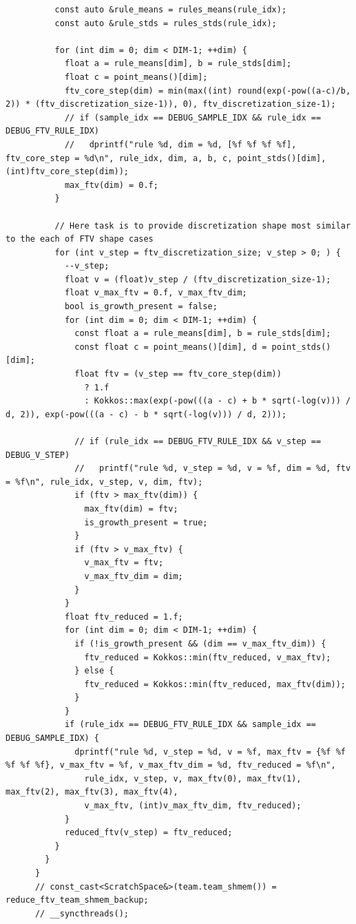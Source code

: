 \begin{verbatim}
          const auto &rule_means = rules_means(rule_idx);
          const auto &rule_stds = rules_stds(rule_idx);

          for (int dim = 0; dim < DIM-1; ++dim) {
            float a = rule_means[dim], b = rule_stds[dim];
            float c = point_means()[dim];
            ftv_core_step(dim) = min(max((int) round(exp(-pow((a-c)/b, 2)) * (ftv_discretization_size-1)), 0), ftv_discretization_size-1);
            // if (sample_idx == DEBUG_SAMPLE_IDX && rule_idx == DEBUG_FTV_RULE_IDX)
            //   dprintf("rule %d, dim = %d, [%f %f %f %f], ftv_core_step = %d\n", rule_idx, dim, a, b, c, point_stds()[dim], (int)ftv_core_step(dim));
            max_ftv(dim) = 0.f;
          }

          // Here task is to provide discretization shape most similar to the each of FTV shape cases
          for (int v_step = ftv_discretization_size; v_step > 0; ) {
            --v_step;
            float v = (float)v_step / (ftv_discretization_size-1);
            float v_max_ftv = 0.f, v_max_ftv_dim;
            bool is_growth_present = false;
            for (int dim = 0; dim < DIM-1; ++dim) {
              const float a = rule_means[dim], b = rule_stds[dim];
              const float c = point_means()[dim], d = point_stds()[dim];
              float ftv = (v_step == ftv_core_step(dim))
                ? 1.f
                : Kokkos::max(exp(-pow(((a - c) + b * sqrt(-log(v))) / d, 2)), exp(-pow(((a - c) - b * sqrt(-log(v))) / d, 2)));

              // if (rule_idx == DEBUG_FTV_RULE_IDX && v_step == DEBUG_V_STEP)
              //   printf("rule %d, v_step = %d, v = %f, dim = %d, ftv = %f\n", rule_idx, v_step, v, dim, ftv);
              if (ftv > max_ftv(dim)) {
                max_ftv(dim) = ftv;
                is_growth_present = true;
              }
              if (ftv > v_max_ftv) {
                v_max_ftv = ftv;
                v_max_ftv_dim = dim;
              }
            }
            float ftv_reduced = 1.f;
            for (int dim = 0; dim < DIM-1; ++dim) {
              if (!is_growth_present && (dim == v_max_ftv_dim)) {
                ftv_reduced = Kokkos::min(ftv_reduced, v_max_ftv);
              } else {
                ftv_reduced = Kokkos::min(ftv_reduced, max_ftv(dim));
              }
            }
            if (rule_idx == DEBUG_FTV_RULE_IDX && sample_idx == DEBUG_SAMPLE_IDX) {
              dprintf("rule %d, v_step = %d, v = %f, max_ftv = {%f %f %f %f %f}, v_max_ftv = %f, v_max_ftv_dim = %d, ftv_reduced = %f\n",
                rule_idx, v_step, v, max_ftv(0), max_ftv(1), max_ftv(2), max_ftv(3), max_ftv(4),
                v_max_ftv, (int)v_max_ftv_dim, ftv_reduced);
            }
            reduced_ftv(v_step) = ftv_reduced;
          }
        }
      }
      // const_cast<ScratchSpace&>(team.team_shmem()) = reduce_ftv_team_shmem_backup;
      // __syncthreads();


\end{verbatim}
